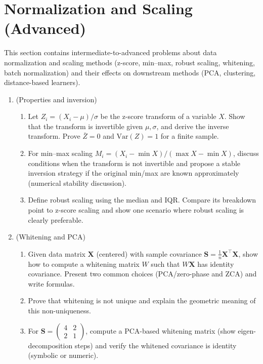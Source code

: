 \documentclass[12pt,a4paper]{article}
\begin{document}


\section{Normalization and Scaling (Advanced)}
This section contains intermediate-to-advanced problems about data normalization and scaling methods (z-score, min–max, robust scaling, whitening, batch normalization) and their effects on downstream methods (PCA, clustering, distance-based learners).
\begin{enumerate}[label=(\arabic*)]
\item (Properties and inversion)
    \begin{enumerate}[label=(\alph*)]
    \item Let \(Z_i=(X_i-\mu)/\sigma\) be the z-score transform of a variable \(X\). Show that the transform is invertible given \(\mu,\sigma\), and derive the inverse transform. Prove \(\bar{Z}=0\) and \(\mathrm{Var}(Z)=1\) for a finite sample.
    \item For min–max scaling \(M_i=(X_i-\min X)/(\max X-\min X)\), discuss conditions when the transform is not invertible and propose a stable inversion strategy if the original min/max are known approximately (numerical stability discussion).
    \item Define robust scaling using the median and IQR. Compare its breakdown point to z-score scaling and show one scenario where robust scaling is clearly preferable.
    \end{enumerate}

\item (Whitening and PCA)
    \begin{enumerate}[label=(\alph*)]
    \item Given data matrix \(\mathbf{X}\) (centered) with sample covariance \(\mathbf{S}=\frac{1}{n}\mathbf{X}^\top\mathbf{X}\), show how to compute a whitening matrix \(W\) such that \(W\mathbf{X}\) has identity covariance. Present two common choices (PCA/zero-phase and ZCA) and write formulas.
    \item Prove that whitening is not unique and explain the geometric meaning of this non-uniqueness.
    \item For \(\mathbf{S}=\begin{pmatrix}4&2\\2&1\end{pmatrix}\), compute a PCA-based whitening matrix (show eigen-decomposition steps) and verify the whitened covariance is identity (symbolic or numeric).
    \end{enumerate}


\end{enumerate}
\end{document}
